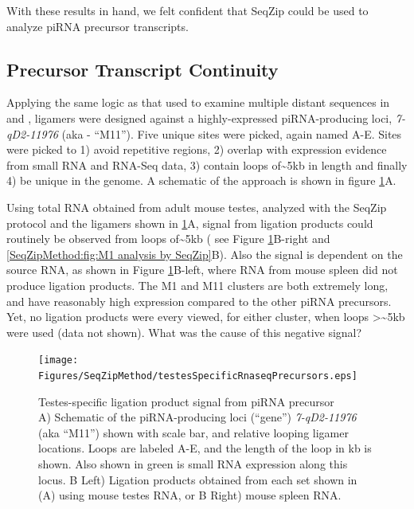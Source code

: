     With these results in hand, we felt confident that SeqZip could be used to analyze piRNA precursor transcripts.

  \subsection{Precursor Transcript Continuity}
    \label{SeqZipMethod:sec:piRNA precursor by SeqZip}

    Applying the same logic as that used to examine multiple distant sequences in \dst{} and \fn{}, ligamers were designed against a highly-expressed piRNA-producing loci, \textit{7-qD2-11976} (aka - ``M11''). Five unique sites were picked, again named A-E. Sites were picked to 1) avoid repetitive regions, 2) overlap with expression evidence from small RNA and RNA-Seq data, 3) contain loops of\textasciitilde5kb in length and finally 4) be unique in the genome. A schematic of the approach is shown in figure \ref{SeqZipMethod:fig:Precursors are testes-specific}A.

    Using total RNA obtained from adult mouse testes, analyzed with the SeqZip protocol and the ligamers shown in \ref{SeqZipMethod:fig:Precursors are testes-specific}A, signal from ligation products could routinely be observed from loops of\textasciitilde5kb ( see Figure \ref{SeqZipMethod:fig:Precursors are testes-specific}B-right and \ref{SeqZipMethod:fig:M1 analysis by SeqZip}B). Also the signal is dependent on the source RNA, as shown in Figure \ref{SeqZipMethod:fig:Precursors are testes-specific}B-left, where RNA from mouse spleen did not produce ligation products. The M1 and M11 clusters are both extremely long, and have reasonably high expression compared to the other piRNA precursors. Yet, no ligation products were every viewed, for either cluster, when loops >\textasciitilde5kb were used (data not shown). What was the cause of this negative signal?

    \begin{figure} %
        \centering 
        \texttt{[image: Figures/SeqZipMethod/testesSpecificRnaseqPrecursors.eps]}
        \caption[Testes-specific ligation product signal from piRNA precursor]
        {
          Testes-specific ligation product signal from piRNA precursor\\[0.25cm]
          A) Schematic of the piRNA-producing loci (``gene'') \textit{7-qD2-11976} (aka ``M11'') shown with scale bar, and relative looping ligamer locations.  Loops are labeled A-E, and the length of the loop in kb is shown.  Also shown in green is small RNA expression along this locus. B Left) Ligation products obtained from each set shown in (A) using mouse testes RNA, or B Right) mouse spleen RNA.
        	}
        \label{SeqZipMethod:fig:Precursors are testes-specific}
      	\end{figure}

